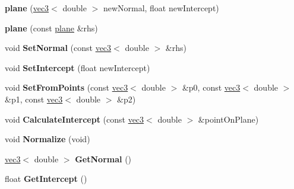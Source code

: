 \begin{DoxyCompactItemize}
\item 
\hypertarget{classmath_1_1plane_a256635e3ae08a3665d2ef9d0e9ea6c45}{
{\bfseries plane} (\hyperlink{classmath_1_1vec3}{vec3}$<$ double $>$ newNormal, float newIntercept)}
\label{classmath_1_1plane_a256635e3ae08a3665d2ef9d0e9ea6c45}

\item 
\hypertarget{classmath_1_1plane_a25c3bf9902eaff31c6b5bbf9a1b3322a}{
{\bfseries plane} (const \hyperlink{classmath_1_1plane}{plane} \&rhs)}
\label{classmath_1_1plane_a25c3bf9902eaff31c6b5bbf9a1b3322a}

\item 
\hypertarget{classmath_1_1plane_a6ae1048272879cd5f747a7b76807e2e4}{
void {\bfseries SetNormal} (const \hyperlink{classmath_1_1vec3}{vec3}$<$ double $>$ \&rhs)}
\label{classmath_1_1plane_a6ae1048272879cd5f747a7b76807e2e4}

\item 
\hypertarget{classmath_1_1plane_a7ed123f20808367fbeda9e75eaaa6766}{
void {\bfseries SetIntercept} (float newIntercept)}
\label{classmath_1_1plane_a7ed123f20808367fbeda9e75eaaa6766}

\item 
\hypertarget{classmath_1_1plane_a8154d69fd029b14b49ca7d002a60e410}{
void {\bfseries SetFromPoints} (const \hyperlink{classmath_1_1vec3}{vec3}$<$ double $>$ \&p0, const \hyperlink{classmath_1_1vec3}{vec3}$<$ double $>$ \&p1, const \hyperlink{classmath_1_1vec3}{vec3}$<$ double $>$ \&p2)}
\label{classmath_1_1plane_a8154d69fd029b14b49ca7d002a60e410}

\item 
\hypertarget{classmath_1_1plane_ad4e5835c002fa75c1f573d9a069ba466}{
void {\bfseries CalculateIntercept} (const \hyperlink{classmath_1_1vec3}{vec3}$<$ double $>$ \&pointOnPlane)}
\label{classmath_1_1plane_ad4e5835c002fa75c1f573d9a069ba466}

\item 
\hypertarget{classmath_1_1plane_afea36d03496c252a22b98506d33117df}{
void {\bfseries Normalize} (void)}
\label{classmath_1_1plane_afea36d03496c252a22b98506d33117df}

\item 
\hypertarget{classmath_1_1plane_ae702f3a39206840b4ebc56e0fa855957}{
\hyperlink{classmath_1_1vec3}{vec3}$<$ double $>$ {\bfseries GetNormal} ()}
\label{classmath_1_1plane_ae702f3a39206840b4ebc56e0fa855957}

\item 
\hypertarget{classmath_1_1plane_ac8127f9e5b508ba2c51a3422122c2511}{
float {\bfseries GetIntercept} ()}
\label{classmath_1_1plane_ac8127f9e5b508ba2c51a3422122c2511}


\end{DoxyCompactItemize}
